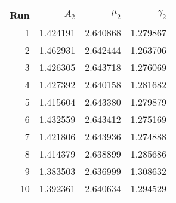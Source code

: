 \begin{tabular}{rrrr}
\toprule
 Run &     $A_2$ &   $\mu_2$ &  $\gamma_2$ \\
\midrule
   1 &  1.424191 &  2.640868 &    1.279867 \\
   2 &  1.462931 &  2.642444 &    1.263706 \\
   3 &  1.426305 &  2.643718 &    1.276069 \\
   4 &  1.427392 &  2.640158 &    1.281682 \\
   5 &  1.415604 &  2.643380 &    1.279879 \\
   6 &  1.432559 &  2.643412 &    1.275169 \\
   7 &  1.421806 &  2.643936 &    1.274888 \\
   8 &  1.414379 &  2.638899 &    1.285686 \\
   9 &  1.383503 &  2.636999 &    1.308632 \\
  10 &  1.392361 &  2.640634 &    1.294529 \\
\bottomrule
\end{tabular}
